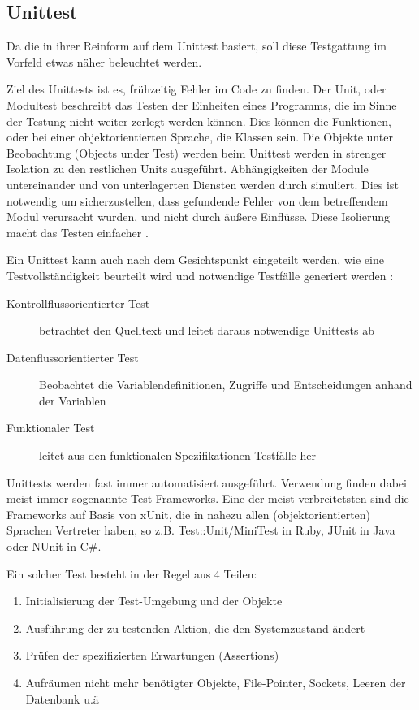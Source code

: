 \subsection{Unittest}
Da die  in ihrer Reinform auf dem Unittest basiert, soll diese Testgattung im Vorfeld etwas näher beleuchtet werden.

Ziel des Unittests ist es, frühzeitig Fehler im Code zu finden. Der Unit, oder Modultest beschreibt das Testen der Einheiten eines Programms, die im Sinne der Testung nicht weiter zerlegt werden können. Dies können die Funktionen, oder bei einer objektorientierten Sprache, die Klassen sein. Die Objekte unter Beobachtung (Objects under Test) werden beim Unittest werden in strenger Isolation zu den restlichen Units ausgeführt. Abhängigkeiten der Module untereinander und von unterlagerten Diensten werden durch  simuliert. Dies ist notwendig um sicherzustellen, dass gefundende Fehler von dem betreffendem Modul verursacht wurden, und nicht durch äußere Einflüsse. Diese Isolierung macht das Testen einfacher \citep{goodliffe_code_2006}.

Ein Unittest kann auch nach dem Gesichtspunkt eingeteilt werden, wie eine Testvollständigkeit beurteilt wird und notwendige Testfälle generiert werden \citep{liggesmeyer_modultest_1990}:
\begin{description}
 \item[Kontrollflussorientierter Test] betrachtet den Quelltext und leitet daraus notwendige Unittests ab
 \item[Datenflussorientierter Test] Beobachtet die Variablendefinitionen, Zugriffe und Entscheidungen anhand der Variablen
 \item[Funktionaler Test] leitet aus den funktionalen Spezifikationen Testfälle her
\end{description}

Unittests werden fast immer automatisiert ausgeführt. Verwendung finden dabei meist immer sogenannte Test-Frameworks. Eine der meist-verbreitetsten sind die Frameworks auf Basis von xUnit, die in nahezu allen (objektorientierten) Sprachen Vertreter haben, so z.B. Test::Unit/MiniTest in Ruby, JUnit in Java oder NUnit in C\#.

Ein solcher Test besteht in der Regel aus 4 Teilen:
\begin{enumerate}
 \item Initialisierung der Test-Umgebung und der Objekte
 \item Ausführung der zu testenden Aktion, die den Systemzustand ändert
 \item Prüfen der spezifizierten Erwartungen (Assertions)
 \item Aufräumen nicht mehr benötigter Objekte, File-Pointer, Sockets, Leeren der Datenbank u.ä 
\end{enumerate}

